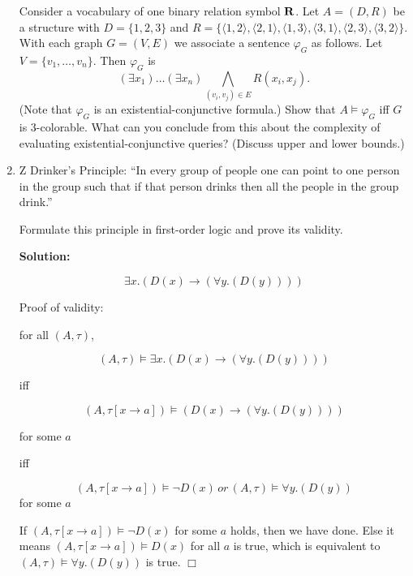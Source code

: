 \documentclass[12pt]{article}
\begin{document}
\begin{enumerate}
		Consider a vocabulary of one binary relation symbol ${\bf R}$.
		Let $A=(D,R)$ be a structure with $D=\{1,2,3\}$ and
		$R=\{\langle 1,2\rangle,
		\langle 2,1\rangle,
		\langle 1,3\rangle,
		\langle 3,1\rangle,
		\langle 2,3\rangle,
		\langle 3,2\rangle\}$.
		With each graph $G=(V,E)$ we associate a sentence $\varphi_G$ as
		follows. Let $V=\{v_1,\ldots,v_n\}$. Then $\varphi_G$ is
		$$ (\exists x_1) \ldots (\exists x_n) 
		\bigwedge_{(v_i,v_j)\in E} R(x_i,x_j).$$
		(Note that $\varphi_G$ is an existential-conjunctive formula.)
		Show that $A \models \varphi_G$ iff $G$ is 3-colorable.
		What can you conclude from this about the complexity
		of evaluating existential-conjunctive queries? 
		(Discuss upper and lower bounds.)
		\item
		Z {\sf Drinker's Principle}: ``In every group of people one can
		point to one person in the group such that if that person drinks then
		all the people in the group drink.''
		
		Formulate this principle in first-order logic and prove its validity.
		
		\textbf{Solution:}
		
		$$
		\exists x. (D(x)\to(\forall y.(D(y))))
		$$
		
		Proof of validity:
		
		for all $(A,\tau)$,
		
		$$
		(A,\tau)\models \exists x. (D(x)\to(\forall y.(D(y))))
		$$
		
		iff 
		
		$$
		(A,\tau[x\to a])\models  (D(x)\to(\forall y.(D(y))))
		$$
		
		for some $a$
		
		iff
		
		$$
		(A,\tau[x\to a])\models \neg D(x)
		\,or\,
		(A,\tau)\models \forall y.(D(y))
		$$
		for some $a$
		
		If $(A,\tau[x\to a])\models \neg D(x)$ for some $a$ holds, then we have done. Else it means $(A,\tau[x\to a])\models D(x)$ for all $a$ is true, which is equivalent to $	(A,\tau)\models \forall y.(D(y))$ is true. $\Box$
	\end{enumerate}
\end{document}

